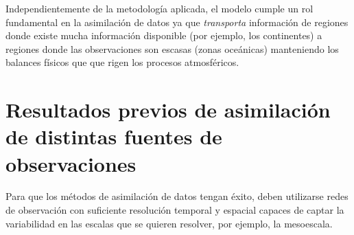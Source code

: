 \documentclass[12pt,twoside]{reedthesis}
\begin{document}
Independientemente de la metodología aplicada, el modelo cumple un rol fundamental en la asimilación de datos ya que \emph{transporta} información de regiones donde existe mucha información disponible (por ejemplo, los continentes) a regiones donde las observaciones son escasas (zonas oceánicas) manteniendo los balances físicos que que rigen los procesos atmosféricos.

\hypertarget{resultados-previos-de-asimilaciuxf3n-de-distintas-fuentes-de-observaciones}{%
\section{Resultados previos de asimilación de distintas fuentes de observaciones}\label{resultados-previos-de-asimilaciuxf3n-de-distintas-fuentes-de-observaciones}}

Para que los métodos de asimilación de datos tengan éxito, deben utilizarse redes de observación con suficiente resolución temporal y espacial capaces de captar la variabilidad en las escalas que se quieren resolver, por ejemplo, la mesoescala.
\end{document}
